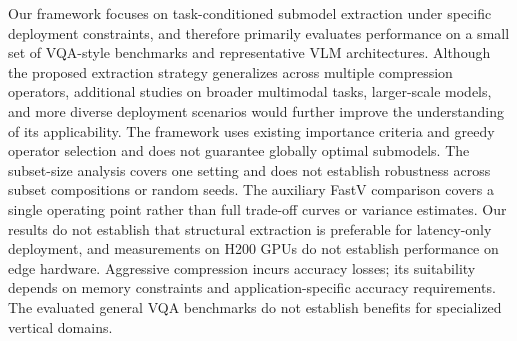 \documentclass[11pt]{article}
\begin{document}
Our framework focuses on task-conditioned submodel extraction under specific deployment constraints, and therefore primarily evaluates performance on a small set of VQA-style benchmarks and representative VLM architectures. Although the proposed extraction strategy generalizes across multiple compression operators, additional studies on broader multimodal tasks, larger-scale models, and more diverse deployment scenarios would further improve the understanding of its applicability. The framework uses existing importance criteria and greedy operator selection and does not guarantee globally optimal submodels. The subset-size analysis covers one setting and does not establish robustness across subset compositions or random seeds. The auxiliary FastV comparison covers a single operating point rather than full trade-off curves or variance estimates. Our results do not establish that structural extraction is preferable for latency-only deployment, and measurements on H200 GPUs do not establish performance on edge hardware. Aggressive compression incurs accuracy losses; its suitability depends on memory constraints and application-specific accuracy requirements. The evaluated general VQA benchmarks do not establish benefits for specialized vertical domains.



%



\appendix


\end{document}
